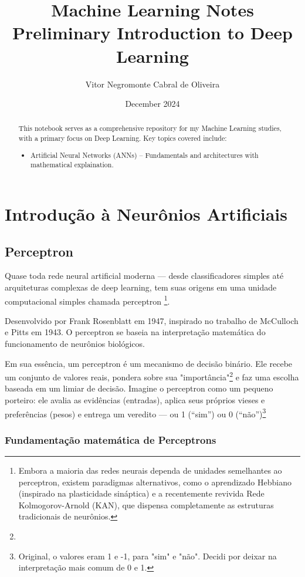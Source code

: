 \documentclass{article}
\title{Machine Learning Notes \\ Preliminary Introduction to Deep Learning}
\author{Vitor Negromonte Cabral de Oliveira}
\date{December 2024}
\begin{document}
\maketitle
\begin{abstract}
    This notebook serves as a comprehensive repository for my Machine Learning studies, with a primary focus on Deep Learning. Key topics covered include:
    \begin{itemize}
        \item Artificial Neural Networks (ANNs) – Fundamentals and architectures with mathematical explaination.
    \end{itemize}
\end{abstract}

\newpage
\tableofcontents
\newpage
\section{Introdução à Neurônios Artificiais}

\subsection{Perceptron}

Quase toda rede neural artificial moderna — desde classificadores simples até arquiteturas complexas de deep learning, tem suas origens em uma unidade computacional simples chamada perceptron \footnote[1]{Embora a maioria das redes neurais dependa de unidades semelhantes ao perceptron, existem paradigmas alternativos, como o aprendizado Hebbiano (inspirado na plasticidade sináptica) e a recentemente revivida Rede Kolmogorov-Arnold (KAN), que dispensa completamente as estruturas tradicionais de neurônios.}.

Desenvolvido por Frank Rosenblatt em 1947, inspirado no trabalho de McCulloch e Pitts em 1943. O perceptron se baseia na interpretação matemática do funcionamento de neurônios biológicos.

Em sua essência, um perceptron é um mecanismo de decisão binário. Ele recebe um conjunto de valores reais, pondera sobre sua "importância"\footnote[2]{} e faz uma escolha baseada em um limiar de decisão. Imagine o perceptron como um pequeno porteiro: ele avalia as evidências (entradas), aplica seus próprios vieses e preferências (pesos) e entrega um veredito — ou 1 (“sim”) ou 0 (“não”)\footnote[3]{Original, o valores eram 1 e -1, para "sim" e "não". Decidi por deixar na interpretação mais comum de 0 e 1.}


\subsubsection{Fundamentação matemática de Perceptrons}
\end{document}
